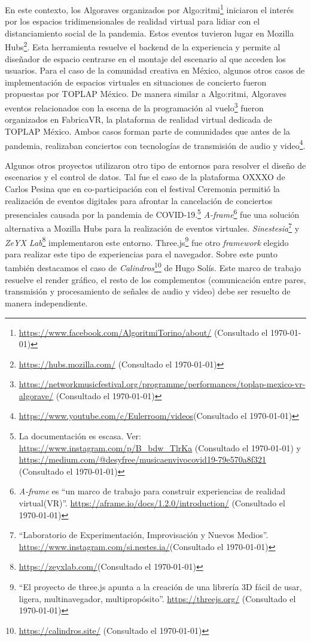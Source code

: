 En este contexto, los Algoraves organizados por Algo:ritmi\footnote{\url{https://www.facebook.com/AlgoritmiTorino/about/} (Consultado el \today)} iniciaron el interés por los espacios tridimensionales de realidad virtual para lidiar con el distanciamiento social de la pandemia. Estos eventos tuvieron lugar en Mozilla Hubs\footnote{\url{https://hubs.mozilla.com/} (Consultado el \today)}. Esta herramienta resuelve el backend de la experiencia y permite al diseñador de espacio centrarse en el montaje del escenario al que acceden los usuarios. Para el caso de la comunidad creativa en México, algunos otros casos de implementación de espacios virtuales en situaciones de concierto fueron propuestas por TOPLAP México. De manera similar a Algo:ritmi, Algoraves eventos relacionados con la escena de la programación al vuelo\footnote{\url{https://networkmusicfestival.org/programme/performances/toplap-mexico-vr-algorave/} (Consultado el \today)} fueron organizados en FabricaVR, la plataforma de realidad virtual dedicada de TOPLAP México. Ambos casos forman parte de comunidades que antes de la pandemia, realizaban conciertos con tecnologías de transmisión de audio y video\footnote{\url{https://www.youtube.com/c/Eulerroom/videos}(Consultado el \today)}.%

Algunos otros proyectos utilizaron otro tipo de entornos para resolver el diseño de escenarios y el control de datos. Tal fue el caso de la plataforma OXXXO de Carlos Pesina que en co-participación con el festival Ceremonia permitió la realización de eventos digitales para afrontar la cancelación de conciertos presenciales causada por la pandemia de COVID-19.\footnote{La documentación es escasa. Ver: \url{https://www.instagram.com/p/B_bdw_TlrKa} (Consultado el \today) y \url{https://medium.com/@desyfree/musicaenvivocovid19-79e570a8f321} (Consultado el \today)} \textit{A-frame}\footnote{\textit{A-frame} es ``un marco de trabajo para construir experiencias de realidad virtual(VR)''. \url{https://aframe.io/docs/1.2.0/introduction/} (Consultado el \today)} fue una solución alternativa a Mozilla Hubs para la realización de eventos virtuales. \textit{Sinestesia}\footnote{``Laboratorio de Experimentación, Improvisación y Nuevos Medios''. \url{https://www.instagram.com/si.nestes.ia/}(Consultado el \today)} y \textit{ZeYX Lab}\footnote{\url{https://zeyxlab.com/}(Consultado el \today)} implementaron este entorno. Three.js\footnote{``El proyecto de three.js apunta a la creación de una librería 3D fácil de usar, ligera, multinavegador, multipropósito''. \url{https://threejs.org/} (Consultado el \today)} fue otro \textit{framework} elegido para realizar este tipo de experiencias para el navegador. Sobre este punto también destacamos el caso de \textit{Calindros}\footnote{\url{https://calindros.site/} (Consultado el \today)} de Hugo Solís. Este marco de trabajo resuelve el render gráfico, el resto de los complementos (comunicación entre pares, transmisión y procesamiento de señales de audio y video) debe ser resuelto de manera independiente. %

